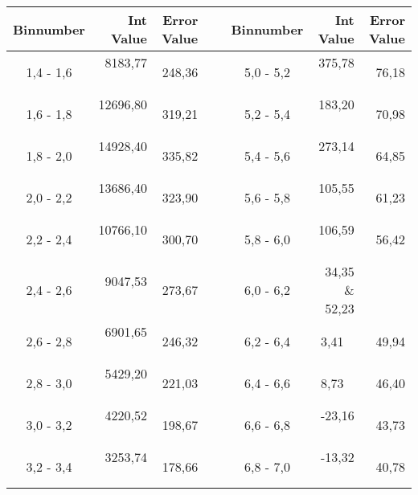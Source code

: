 \begin{table}[]
	\centering

	\begin{tabular}{ | c || r | r ||  l  || c || r | r | }
		\hline
		Binnumber & Int Value & Error Value & \ & Binnumber & Int Value & Error Value \\ \hline
		1,4 - 1,6 & 8183,77 \  & 248,36 \hspace{3mm}  & \ &  5,0 - 5,2 & 375,78 \, & 76,18 \hspace{3mm} \\ \hline
		1,6 - 1,8 & 12696,80 \ & 319,21 \hspace{3mm} & \ &  5,2 - 5,4 & 183,20 \, & 70,98 \hspace{3mm} \\ \hline
		1,8 - 2,0 & 14928,40 \ & 335,82 \hspace{3mm} & \ &  5,4 - 5,6 & 273,14 \, & 64,85 \hspace{3mm} \\ \hline
		2,0 - 2,2 & 13686,40 \ & 323,90 \hspace{3mm} & \ &  5,6 - 5,8 & 105,55 \, & 61,23 \hspace{3mm} \\ \hline
		2,2 - 2,4 & 10766,10 \ & 300,70 \hspace{3mm} & \ &  5,8 - 6,0 & 106,59 \, & 56,42 \hspace{3mm} \\ \hline
		2,4 - 2,6 & 9047,53 \  & 273,67 \hspace{3mm} & \ &  6,0 - 6,2 & 34,35 \& 52,23 \hspace{3mm} \\ \hline
		2,6 - 2,8 & 6901,65 \  & 246,32 \hspace{3mm} & \ &  6,2 - 6,4 & 3,41 \ & 49,94 \hspace{3mm} \\ \hline
		2,8 - 3,0 & 5429,20 \  & 221,03 \hspace{3mm} & \ &  6,4 - 6,6 & 8,73 \   & 46,40 \hspace{3mm} \\ \hline
		3,0 - 3,2 & 4220,52 \  & 198,67 \hspace{3mm} & \ &  6,6 - 6,8 & -23,16 \ & 43,73 \hspace{3mm} \\ \hline
		3,2 - 3,4 & 3253,74 \ & 178,66 \hspace{3mm} & \ &  6,8 - 7,0 & -13,32 \ & 40,78 \hspace{3mm} \\ \hline

\end{tabular}
\end{table}
